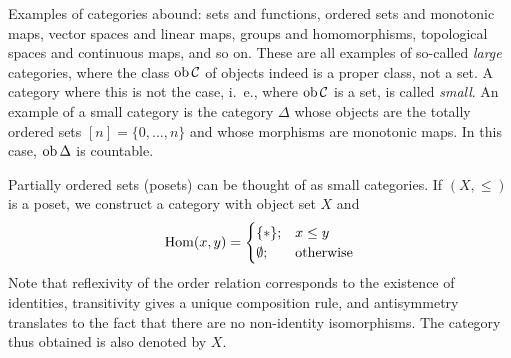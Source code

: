 \documentclass[a4paper,openany]{scrbook}
\renewcommand{\C}{\mathcal C}
\begin{document}
Examples of categories abound: sets and functions, ordered sets and monotonic maps, vector spaces and linear maps, groups and homomorphisms, topological spaces and continuous maps, and so on. These are all examples of so-called \emph{large} categories, where the class $\ob \C$ of objects indeed is a proper class, not a set. A category where this is not the case, i.~e., where $\ob \C$ is a set, is called \emph{small}. An example of a small category is the category $\Delta$ whose objects are the totally ordered sets $[n] = \{0,\dots,n\}$ and whose morphisms are monotonic maps. In this case, $\operatorname{ob} \Delta$ is countable.

\begin{example} \label{exa:posetcat}
Partially ordered sets (posets) can be thought of as small categories. If $(X,\leq)$ is a poset, we construct a category with object set $X$ and
\[
\operatorname{Hom}(x,y) = \begin{cases} \{*\};& x \leq y\\ \emptyset; &\text{otherwise}\end{cases}
\]
Note that reflexivity of the order relation corresponds to the existence of identities, transitivity gives a unique composition rule, and antisymmetry translates to the fact that there are no non-identity isomorphisms. The category thus obtained is also denoted by $X$.
\end{example}
\end{document}
